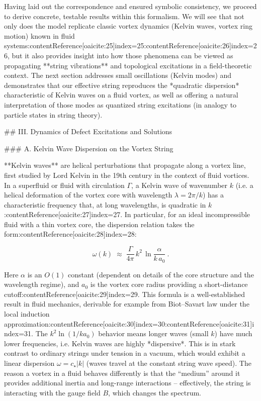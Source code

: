 \documentclass[12pt]{article}
\begin{document}
Having laid out the correspondence and ensured symbolic consistency, we proceed to derive concrete, testable results within this formalism. We will see that not only does the model replicate classic vortex dynamics (Kelvin waves, vortex ring motion) known in fluid systems:contentReference[oaicite:25]{index=25}:contentReference[oaicite:26]{index=26}, but it also provides insight into how those phenomena can be viewed as propagating **string vibrations** and topological excitations in a field-theoretic context. The next section addresses small oscillations (Kelvin modes) and demonstrates that our effective string reproduces the *quadratic dispersion* characteristic of Kelvin waves on a fluid vortex, as well as offering a natural interpretation of those modes as quantized string excitations (in analogy to particle states in string theory).

## III. Dynamics of Defect Excitations and Solutions

### A. Kelvin Wave Dispersion on the Vortex String 

**Kelvin waves** are helical perturbations that propagate along a vortex line, first studied by Lord Kelvin in the 19th century in the context of fluid vortices. In a superfluid or fluid with circulation $\Gamma$, a Kelvin wave of wavenumber $k$ (i.e. a helical deformation of the vortex core with wavelength $\lambda = 2\pi/k$) has a characteristic frequency that, at long wavelengths, is quadratic in $k$:contentReference[oaicite:27]{index=27}. In particular, for an ideal incompressible fluid with a thin vortex core, the dispersion relation takes the form:contentReference[oaicite:28]{index=28}:

\[ \omega(k) \;\approx\; \frac{\Gamma}{4\pi} \, k^2 \,\ln\!\frac{\alpha}{k\,a_0}~. \tag{8}\] 

Here $\alpha$ is an $O(1)$ constant (dependent on details of the core structure and the wavelength regime), and $a_0$ is the vortex core radius providing a short-distance cutoff:contentReference[oaicite:29]{index=29}. This formula is a well-established result in fluid mechanics, derivable for example from Biot–Savart law under the local induction approximation:contentReference[oaicite:30]{index=30}:contentReference[oaicite:31]{index=31}. The $k^2 \ln(1/k a_0)$ behavior means longer waves (small $k$) have much lower frequencies, i.e. Kelvin waves are highly *dispersive*. This is in stark contrast to ordinary strings under tension in a vacuum, which would exhibit a linear dispersion $\omega = c_\star |k|$ (waves travel at the constant string wave speed). The reason a vortex in a fluid behaves differently is that the “medium” around it provides additional inertia and long-range interactions – effectively, the string is interacting with the gauge field $B$, which changes the spectrum.
\end{document}
